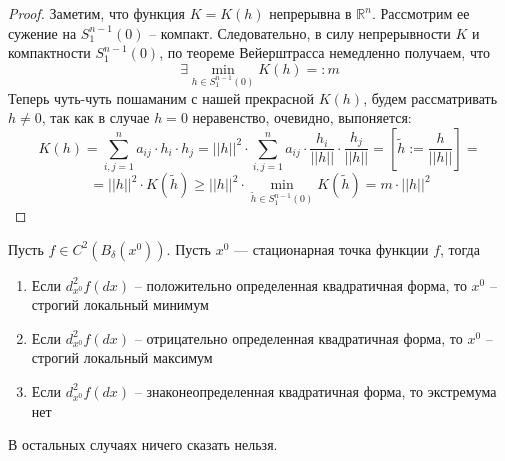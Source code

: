 \documentclass[11pt]{article}
\begin{document}
\begin{proof}
    Заметим, что функция $K = K(h)$ непрерывна в $\mathbb{R}^n$. Рассмотрим ее сужение
    на $S^{n-1}_1(0)$ -- компакт. Следовательно, в силу непрерывности $K$ и компактности 
    $S^{n-1}_1(0)$, по теореме Вейерштрасса немедленно получаем, что 
    \[\exists \min_{h \in S^{n-1}_1(0)}K(h) =: m\]
    Теперь чуть-чуть пошаманим с нашей прекрасной $K(h)$, будем рассматривать $h \ne 0$, 
    так как в случае $h = 0$ неравенство, очевидно, выпоняется:
    \[K(h) = \sum_{i, j = 1}^n a_{ij} \cdot h_i \cdot h_j = \left|\left|h\right|\right|^2
    \cdot \sum_{i, j = 1}^n a_{ij} \cdot \frac{h_i}{\left|\left|h\right|\right|} \cdot 
    \frac{h_j}{\left|\left|h\right|\right|} = \left[\widetilde{h} := \frac{h}
    {\left|\left|h\right|\right|}\right] =\]
    \[= \left|\left|h\right|\right|^2 \cdot K(\widetilde{h}) \geq \left|\left|h\right|\right|^2
    \cdot \min_{\widetilde{h} \in S_1^{n-1}(0)} K(\widetilde{h}) = m \cdot \left|\left|h\right|\right|^2\]
\end{proof}

\begin{theorem}
    Пусть $f \in C^2(B_\delta(x^0))$. Пусть $x^0$ --- стационарная точка функции $f$, тогда
    \begin{enumerate}
        \item Если $d^2_{x^0}f(dx)$ -- положительно определенная квадратичная форма,
        то $x^0$ -- строгий локальный минимум
        \item Если $d^2_{x^0}f(dx)$ -- отрицательно определенная квадратичная форма,
        то $x^0$ -- строгий локальный максимум
        \item Если $d^2_{x^0}f(dx)$ -- знаконеопределенная квадратичная форма,
        то экстремума нет 
    \end{enumerate}
    В остальных случаях ничего сказать нельзя.
\end{theorem}
\end{document}
